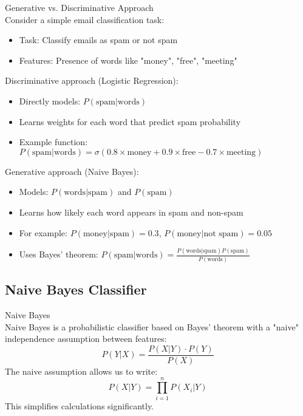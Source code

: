\begin{example2}{Generative vs. Discriminative Approach}\\
Consider a simple email classification task:
\begin{itemize}
    \item Task: Classify emails as spam or not spam
    \item Features: Presence of words like "money", "free", "meeting"
\end{itemize}
\tcblower
Discriminative approach (Logistic Regression):
\begin{itemize}
    \item Directly models: $P(\text{spam}|\text{words})$
    \item Learns weights for each word that predict spam probability
    \item Example function: $P(\text{spam}|\text{words}) = \sigma(0.8 \times \text{money} + 0.9 \times \text{free} - 0.7 \times \text{meeting})$
\end{itemize}

Generative approach (Naive Bayes):
\begin{itemize}
    \item Models: $P(\text{words}|\text{spam})$ and $P(\text{spam})$
    \item Learns how likely each word appears in spam and non-spam
    \item For example: $P(\text{money}|\text{spam}) = 0.3$, $P(\text{money}|\text{not spam}) = 0.05$
    \item Uses Bayes' theorem: $P(\text{spam}|\text{words}) = \frac{P(\text{words}|\text{spam})P(\text{spam})}{P(\text{words})}$
\end{itemize}
\end{example2}

\subsection{Naive Bayes Classifier}

\begin{definition}{Naive Bayes}\\
Naive Bayes is a probabilistic classifier based on Bayes' theorem with a "naive" independence assumption between features:
\[P(Y|X) = \frac{P(X|Y) \cdot P(Y)}{P(X)}\]
The naive assumption allows us to write:
\[P(X|Y) = \prod_{i=1}^{n} P(X_i|Y)\]
This simplifies calculations significantly.
\end{definition}

